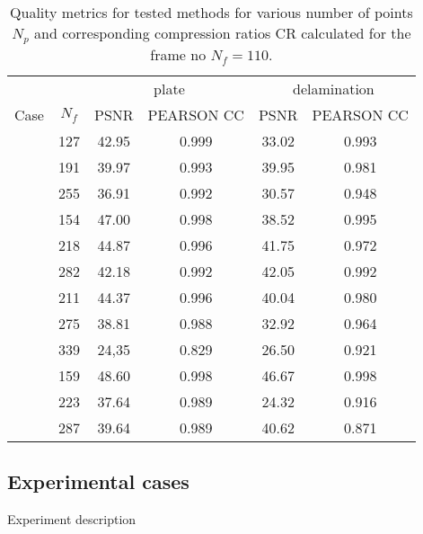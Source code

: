 \begin{table}[]
	\centering \footnotesize
	\caption{Quality metrics for tested methods for various number of points $N_p$ and corresponding compression ratios CR calculated for the frame no $N_f=110$.}	
	\begin{tabular}{lccccc}
		\toprule
		& & \multicolumn{2}{c}{plate} & \multicolumn{2}{c}{delamination} \\
		\cmidrule(lr){3-4} \cmidrule(lr){5-6}
		Case & $N_f$ & PSNR & PEARSON CC & PSNR & PEARSON CC \\ 
		\midrule
		\multirow{3}{*}{}  & 127  & 42.95 & 0.999 & 33.02 & 0.993 \\
		\multirow{3}{*}{} 1 & 191  & 39.97 & 0.993 & 39.95 & 0.981 \\
		\multirow{3}{*}{}  & 255 & 36.91 & 0.992 & 30.57 & 0.948 \\ 
		\midrule
		\multirow{3}{*}{}  & 154 & 47.00 & 0.998 & 38.52 & 0.995 \\
		\multirow{3}{*}{} 2 & 218 & 44.87 & 0.996 & 41.75 & 0.972\\
		\multirow{3}{*}{}  & 282 & 42.18 & 0.992 & 42.05 & 0.992 \\ 
		\midrule
		\multirow{3}{*}{}  & 211 & 44.37 & 0.996 & 40.04 & 0.980 \\
		\multirow{3}{*}{} 3 & 275 & 38.81 & 0.988 & 32.92 & 0.964 \\
		\multirow{3}{*}{}  & 339 & 24,35 & 0.829 & 26.50 & 0.921 \\ 
		\midrule
		\multirow{3}{*}{}  & 159 & 48.60 & 0.998 & 46.67 & 0.998 \\
		\multirow{3}{*}{} 4 & 223 & 37.64 & 0.989 & 24.32 & 0.916 \\
		\multirow{3}{*}{}  & 287 & 39.64 & 0.989 & 40.62 & 0.871 \\ 
		
		\bottomrule
	\end{tabular}
\end{table}

\clearpage

\subsection{Experimental cases}
\label{sec542}
Experiment description

